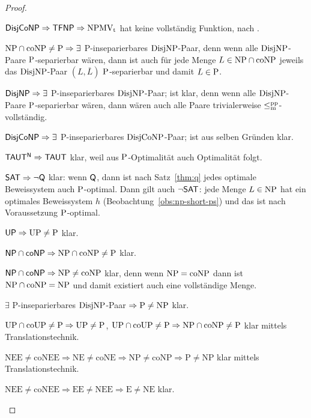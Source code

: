 \begin{proof}
\begin{Prooflist}[noitemsep,midpenalty=0, label={\arabic*.},labelsep=3pt]
\item $\hDisjCoNP \Rightarrow \hTFNP \Rightarrow \NPMVt$ hat keine vollständig Funktion, nach \textcite[Prop.~5.6, 5.10]{pudlak_incompleteness_2017}.
\item $\NP\cap\coNP\neq \P \Rightarrow\exists$ P-inseparierbares $\DisjNP$-Paar, denn wenn alle $\DisjNP$-Paare $\P$-separierbar wären, dann ist auch für jede Menge $L\in\NP\cap\coNP$ jeweils das $\DisjNP$-Paar $(L,\overline{L})$ $\P$-separierbar und damit $L\in\P$.
\item $\hDisjNP \Rightarrow \exists$ P-inseparierbares $\DisjNP$-Paar; ist klar, denn wenn alle $\DisjNP$-Paare $\P$-separierbar wären, dann wären auch alle Paare trivialerweise $\leqmpp$-vollständig.
\item $\hDisjCoNP \Rightarrow \exists$ P-inseparierbares $\DisjCoNP$-Paar; ist aus selben Gründen klar.
\item $\mathsf{TAUT^N} \Rightarrow \hTAUT$ klar, weil aus $\P$-Optimalität auch Optimalität folgt.
\item $\mathsf \hSAT \Rightarrow \neg\hQ $ klar: wenn $\hQ$, dann ist nach Satz~\ref{thm:q} jedes optimale Beweissystem auch $\P$-optimal. Dann gilt auch $\neg\hSAT$: jede Menge $L\in\NP$ hat ein optimales Beweissystem $h$ (Beobachtung~\ref{obs:np-short-ps}) und das ist nach Voraussetzung $\P$-optimal.
\item $\hUP \Rightarrow \UP\neq\P$ klar.
\item $\hNPcoNP \Rightarrow \NP\cap\coNP\neq \P$ klar.
\item $\hNPcoNP \Rightarrow \NP\neq\coNP$ klar, denn wenn $\NP=\coNP$ dann ist $\NP\cap\coNP=\NP$ und damit existiert auch eine vollständige Menge.
\item $\exists$ P-inseparierbares $\DisjNP$-Paar $\Rightarrow \P\neq \NP$ klar.
\item $\UP\cap\coUP\neq\P \Rightarrow \UP\neq \P$, $\UP\cap\coUP\neq\P\Rightarrow \NP\cap\coNP\neq\P$ klar mittels Translationstechnik.
\item $\mathrm{NEE\neq coNEE \Rightarrow NE \neq coNE \Rightarrow NP \neq coNP \Rightarrow P\neq NP}$ klar mittels Translationstechnik.
\item $\mathrm{NEE\neq coNEE \Rightarrow EE \neq NEE \Rightarrow E\neq NE}$ klar.\qedhere
\end{Prooflist}
\end{proof}

